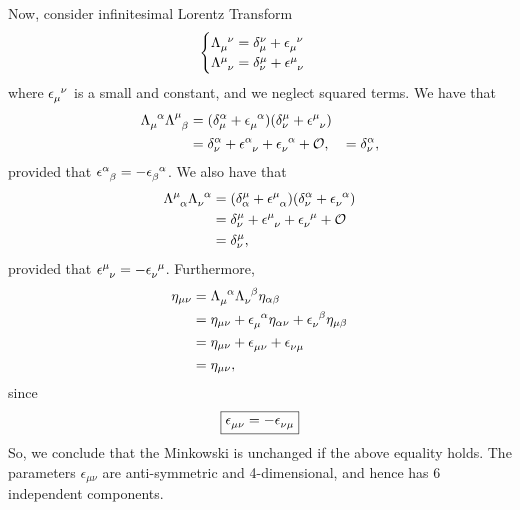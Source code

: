 \documentclass{book}
\numberwithin{equation}{section}
\theoremstyle{definition}
\begin{document}
Now, consider infinitesimal Lorentz Transform 
\begin{align}
\begin{cases}
\tensor{\Lambda}{_\mu^\nu} = \delta^\nu_\mu + \tensor{\epsilon}{_\mu^\nu}\\
\tensor{\Lambda}{^\mu_\nu} = \delta^\mu_\nu + \tensor{\epsilon}{^\mu_\nu}
\end{cases}
\end{align}
where $\tensor{\epsilon}{_\mu^\nu}$ is a small and constant, and we neglect squared terms. We have that 
\begin{align}
\tensor{\Lambda}{_\mu^\alpha}\tensor{\Lambda}{^\mu_\beta} &= (\delta^\alpha_\mu + \tensor{\epsilon}{_\mu^\alpha})(\delta^\mu_\nu + \tensor{\epsilon}{^\mu_\nu})\\
&= \delta^\alpha_\nu + \tensor{\epsilon}{^\alpha_\nu} + \tensor{\epsilon}{_\nu^\alpha} + \mathcal{O},
&= \delta^\alpha_\nu,
\end{align}
provided that $\tensor{\epsilon}{^\alpha_\beta} = -\tensor{\epsilon}{_\beta^\alpha}$. We also have that
\begin{align*}
\tensor{\Lambda}{^\mu_\alpha}\tensor{\Lambda}{_\nu^\alpha}
&= (\delta^\mu_\alpha + \tensor{\epsilon}{^\mu_\alpha})(\delta^\alpha_\nu + \tensor{\epsilon}{_\nu^\alpha})\\
&= \delta^\mu_\nu + \tensor{\epsilon}{^\mu_\nu} + \tensor{\epsilon}{_\nu^\mu} + \mathcal{O}\\
&= \delta^\mu_\nu,
\end{align*}
provided that $\tensor{\epsilon}{^\mu_\nu} = -\tensor{\epsilon}{_\nu^\mu}$. Furthermore,
\begin{align*}
\eta_{\mu\nu} 
&= \tensor{\Lambda}{_\mu^\alpha}\tensor{\Lambda}{_\nu^\beta}\eta_{\alpha\beta}\\
&= \eta_{\mu\nu} + \tensor{\epsilon}{_\mu^\alpha}\eta_{\alpha\nu} + \tensor{\epsilon}{_\nu^\beta}\eta_{\mu\beta}\\
&= \eta_{\mu\nu} + \tensor{\epsilon}{_{\mu\nu}} + \tensor{\epsilon}{_{\nu\mu}}\\
&= \eta_{\mu\nu},
\end{align*}
since 
\begin{align*}
\boxed{\tensor{\epsilon}{_{\mu\nu}} = -\tensor{\epsilon}{_{\nu\mu}}}
\end{align*}
So, we conclude that the Minkowski is unchanged if the above equality holds. The parameters $\epsilon_{\mu\nu}$ are anti-symmetric and 4-dimensional, and hence has 6 independent components. \\
\end{document}
